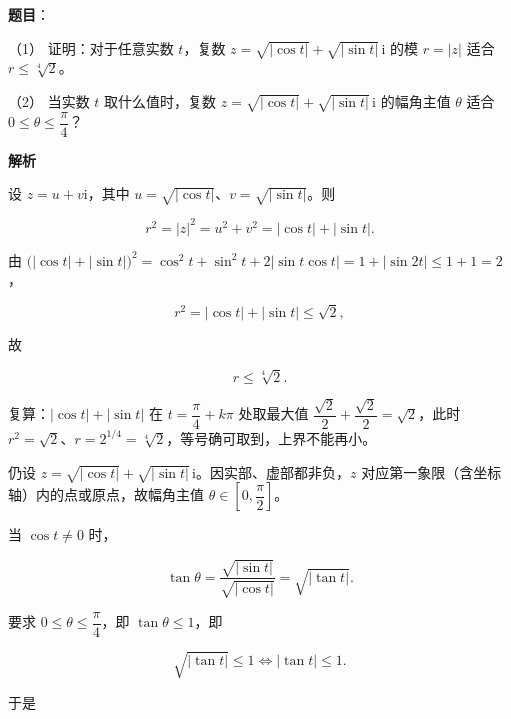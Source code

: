 \begin{answer}

\textbf{题目}：

（1） 证明：对于任意实数 $t$，复数 $z=\sqrt{\lvert\cos t\rvert}+\sqrt{\lvert\sin t\rvert}\,\mathrm i$ 的模 $r=\lvert z\rvert$ 适合 $r\leqslant\sqrt[4]{2}$。

（2） 当实数 $t$ 取什么值时，复数 $z=\sqrt{\lvert\cos t\rvert}+\sqrt{\lvert\sin t\rvert}\,\mathrm i$ 的幅角主值 $\theta$ 适合 $0\leqslant\theta\leqslant\dfrac{\pi}{4}$？

\textbf{解析}


设 $z=u+v\mathrm i$，其中 $u=\sqrt{\lvert\cos t\rvert}$、$v=\sqrt{\lvert\sin t\rvert}$。则

\nopagebreak[4]
\[
r^2=\lvert z\rvert^2=u^2+v^2=\lvert\cos t\rvert+\lvert\sin t\rvert.
\]

由 $\bigl(\lvert\cos t\rvert+\lvert\sin t\rvert\bigr)^2=\cos^2t+\sin^2t+2\lvert\sin t\cos t\rvert=1+\lvert\sin 2t\rvert\leqslant1+1=2$，

\nopagebreak[4]
\[
r^2=\lvert\cos t\rvert+\lvert\sin t\rvert\leqslant\sqrt2,
\]

故

\nopagebreak[4]
\[
r\leqslant\sqrt[4]{2}.
\]

复算：$\lvert\cos t\rvert+\lvert\sin t\rvert$ 在 $t=\dfrac\pi4+k\pi$ 处取最大值 $\dfrac{\sqrt2}{2}+\dfrac{\sqrt2}{2}=\sqrt2$，此时 $r^2=\sqrt2$、$r=2^{1/4}=\sqrt[4]{2}$，等号确可取到，上界不能再小。


仍设 $z=\sqrt{\lvert\cos t\rvert}+\sqrt{\lvert\sin t\rvert}\,\mathrm i$。因实部、虚部都非负，$z$ 对应第一象限（含坐标轴）内的点或原点，故幅角主值 $\theta\in\left[0,\dfrac\pi2\right]$。

当 $\cos t\neq0$ 时，

\nopagebreak[4]
\[
\tan\theta=\frac{\sqrt{\lvert\sin t\rvert}}{\sqrt{\lvert\cos t\rvert}}=\sqrt{\lvert\tan t\rvert}.
\]

要求 $0\leqslant\theta\leqslant\dfrac\pi4$，即 $\tan\theta\leqslant1$，即

\nopagebreak[4]
\[
\sqrt{\lvert\tan t\rvert}\leqslant1\iff\lvert\tan t\rvert\leqslant1.
\]

于是


\end{answer}
